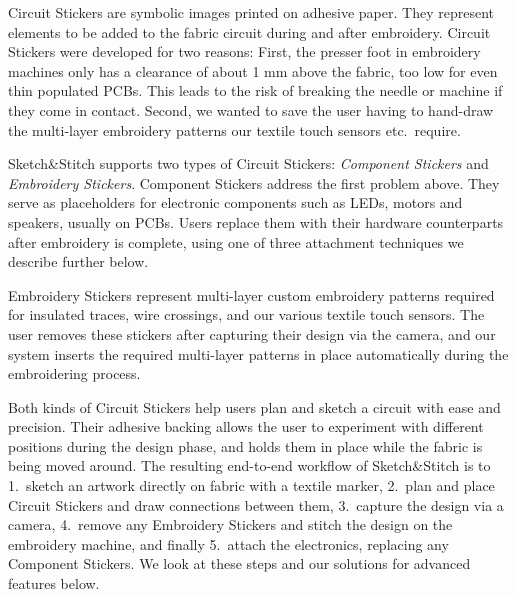 \documentclass[header.tex]{subfiles}
\begin{document}
Circuit Stickers are symbolic images printed on adhesive paper. %
They represent elements to be added to the fabric circuit during and after embroidery. Circuit Stickers were developed for two reasons: First, the presser foot in embroidery machines only has a clearance of about 1 mm above the fabric, too low for even thin populated PCBs. This leads to the risk of breaking the needle or machine if they come in contact. Second, we wanted to save the user having to hand-draw the multi-layer embroidery patterns our textile touch sensors etc.\ require.

Sketch\&Stitch supports two types of Circuit Stickers: \emph{Component Stickers} and \emph{Embroidery Stickers}. Component Stickers address the first problem above. They serve as placeholders for electronic components such as LEDs, motors and speakers, usually on PCBs. Users replace them with their hardware counterparts after embroidery is complete, using one of three attachment techniques we describe further below.

Embroidery Stickers represent multi-layer custom embroidery patterns required for insulated traces, wire crossings, and our various textile touch sensors.
The user removes these stickers after capturing their design via the camera, and our system inserts the required multi-layer patterns in place automatically during the embroidering process.

Both kinds of Circuit Stickers help users plan and sketch a circuit with ease and precision. Their adhesive backing allows the user to experiment with different positions  during the design phase, and holds them in place while the fabric is being moved around.
The resulting end-to-end workflow of Sketch\&Stitch is to 1.\ sketch an artwork directly on fabric with a textile marker, 2.\ plan and place Circuit Stickers and draw connections between them, 3.\ capture the design via a camera, 4.\ remove any Embroidery Stickers and stitch the design on the embroidery machine, and finally 5.\ attach the electronics, replacing any Component Stickers. We look at these steps and our solutions for advanced features below.

\end{document}
